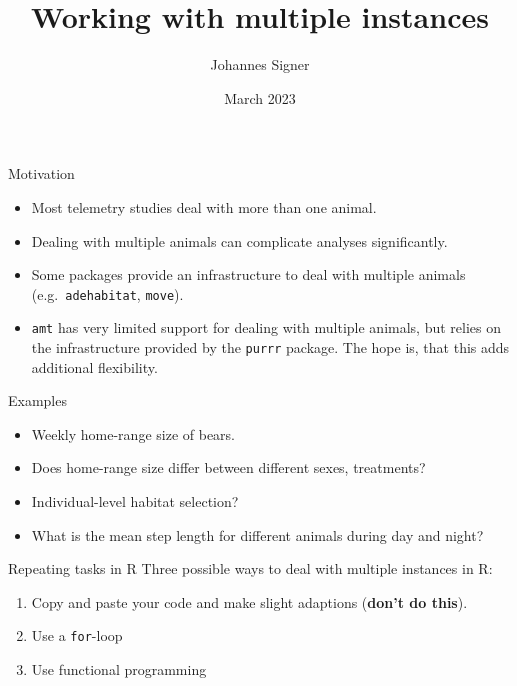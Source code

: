 \documentclass[ignorenonframetext,,t]{beamer}
\title{Working with multiple instances}
\author{Johannes Signer}
\date{March 2023}
\let\oldtextbf\textbf
\renewcommand{\textbf}[1]{\textcolor{spamwell}{\oldtextbf{#1}}}
\providecommand{\tightlist}{%
\setlength{\itemsep}{0pt}\setlength{\parskip}{0pt}}
\providecommand{\tightlist}{%
\setlength{\itemsep}{0pt}\setlength{\parskip}{0pt}}
\renewcommand{\tightlist}{\setlength{\itemsep}{1.4ex}\setlength{\parskip}{0pt}}
\begin{document}
\frame{\titlepage}



\begin{frame}[fragile]{Motivation}
\protect\hypertarget{motivation}{}
\begin{itemize}
\tightlist
\item
  Most telemetry studies deal with more than one animal.
\item
  Dealing with multiple animals can complicate analyses significantly.
\item
  Some packages provide an infrastructure to deal with multiple animals
  (e.g.~\texttt{adehabitat}, \texttt{move}).
\item
  \texttt{amt} has very limited support for dealing with multiple
  animals, but relies on the infrastructure provided by the
  \texttt{purrr} package. The hope is, that this adds additional
  flexibility.
\end{itemize}
\end{frame}

\begin{frame}{Examples}
\protect\hypertarget{examples}{}
\begin{itemize}
\tightlist
\item
  Weekly home-range size of bears.
\item
  Does home-range size differ between different sexes, treatments?
\item
  Individual-level habitat selection?
\item
  What is the mean step length for different animals during day and
  night?
\end{itemize}
\end{frame}

\begin{frame}[fragile]{Repeating tasks in R}
\protect\hypertarget{repeating-tasks-in-r}{}
Three possible ways to deal with multiple instances in R:

\begin{enumerate}
\tightlist
\item
  Copy and paste your code and make slight adaptions (\textbf{don't do
  this}).
\item
  Use a \texttt{for}-loop
\item
  Use functional programming
\end{enumerate}
\end{frame}
\end{document}
